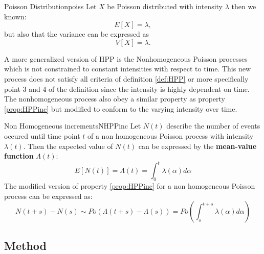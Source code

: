 \begin{properties}{Poisson Distribution}{poiss}
Let $X$ be Poisson distributed with intensity $\lambda$ then we known:
\begin{equation}
    E[X] = \lambda,
\end{equation}
\label{eq:PoisE}
but also that the variance can be expressed as
\begin{equation}
    V[X] = \lambda.
\end{equation}
\label{eq:PoisV}
\end{properties}

A more generalized version of HPP is the Nonhomogeneous Poisson processes which is not constrained to constant intensities with respect to time. This new process does not satisfy all criteria of definition \ref{def:HPP} or more specifically point 3 and 4 of the definition since the intensity is highly dependent on time. The nonhomogeneous process also obey a similar property as property \ref{prop:HPPinc} but modified to conform to the varying intensity over time.
\begin{properties}{Non Homogeneous increments}{NHPPinc}
Let $N(t)$ describe the number of events occured until time point $t$ of a non homogeneous Poisson process with intensity $\lambda(t)$. Then the expected value of $N(t)$ can be expressed by the \textbf{mean-value function} $\Lambda(t)$:
\begin{equation}
    E[N(t)] = \Lambda(t) =\int_0^t\lambda(\alpha)d\alpha
\end{equation}
\label{eq:NHPPexp}
\noindent
The modified version of property \ref{prop:HPPinc} for a non homogeneous Poisson process can be expressed as:
\begin{equation}
    N(t+s)-N(s)\sim \textit{Po}(\Lambda(t+s)-\Lambda(s))=\textit{Po}(\int_{s}^{t+s}\lambda(\alpha)d\alpha)
\end{equation}
\label{eq:NHPPinc}
\end{properties}
\subsection{Method}
\label{sec:method3}

